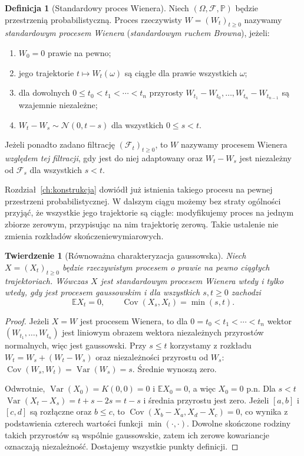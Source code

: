 \documentclass[11pt,a4paper,oneside]{report}
\numberwithin{equation}{chapter}
\theoremstyle{plain}
\newtheorem{twierdzenie}{Twierdzenie}[chapter]
\theoremstyle{definition}
\newtheorem{definicja}{Definicja}[chapter]
\theoremstyle{remark}
\newcommand{\Prob}{\mathbb{P}}
\newcommand{\E}{\mathbb{E}}
\newcommand{\Var}{\operatorname{Var}}
\newcommand{\Cov}{\operatorname{Cov}}
\newcommand{\calF}{\mathcal{F}}
\newcommand{\Normal}{\mathcal{N}}
\begin{document}
\begin{definicja}[Standardowy proces Wienera]
Niech $(\Omega,\calF,\Prob)$ będzie przestrzenią probabilistyczną.
Proces rzeczywisty $W=(W_t)_{t\ge0}$ nazywamy
\emph{standardowym procesem Wienera} (\emph{standardowym ruchem Browna}),
jeżeli:
\begin{enumerate}
\item $W_0=0$ prawie na pewno;
\item jego trajektorie $t\mapsto W_t(\omega)$ są ciągłe dla prawie
wszystkich $\omega$;
\item dla dowolnych $0\le t_0<t_1<\cdots<t_n$ przyrosty
$W_{t_1}-W_{t_0},\ldots,W_{t_n}-W_{t_{n-1}}$
są wzajemnie niezależne;
\item $W_t-W_s\sim\Normal(0,t-s)$ dla wszystkich $0\le s<t$.
\end{enumerate}
Jeżeli ponadto zadano filtrację $(\calF_t)_{t\ge0}$, to $W$
nazywamy procesem Wienera \emph{względem tej filtracji},
gdy jest do niej adaptowany oraz $W_t-W_s$ jest niezależny
od $\calF_s$ dla wszystkich $s<t$.
\end{definicja}

Rozdział~\ref{ch:konstrukcja} dowiódł już istnienia takiego
procesu na pewnej przestrzeni probabilistycznej.
W dalszym ciągu możemy bez straty ogólności przyjąć,
że wszystkie jego trajektorie są ciągłe: modyfikujemy proces
na jednym zbiorze zerowym, przypisując na nim trajektorię zerową.
Takie ustalenie nie zmienia rozkładów skończeniewymiarowych.

\begin{twierdzenie}[Równoważna charakteryzacja gaussowska]
Niech $X=(X_t)_{t\ge0}$ będzie rzeczywistym procesem
o prawie na pewno ciągłych trajektoriach. Wówczas $X$
jest standardowym procesem Wienera wtedy i tylko wtedy,
gdy jest procesem gaussowskim i dla wszystkich $s,t\ge0$
zachodzi
\[
\E X_t=0,\qquad \Cov(X_s,X_t)=\min(s,t).
\]
\end{twierdzenie}
\begin{proof}
Jeżeli $X=W$ jest procesem Wienera, to dla
$0=t_0<t_1<\cdots<t_n$ wektor $(W_{t_1},\ldots,W_{t_n})$
jest liniowym obrazem wektora niezależnych przyrostów normalnych,
więc jest gaussowski. Przy $s\le t$ korzystamy z rozkładu
$W_t=W_s+(W_t-W_s)$ oraz niezależności przyrostu od $W_s$:
$\Cov(W_s,W_t)=\Var(W_s)=s$. Średnie wynoszą zero.

Odwrotnie, $\Var(X_0)=K(0,0)=0$ i $\E X_0=0$,
a więc $X_0=0$ p.n. Dla $s<t$
$\Var(X_t-X_s)=t+s-2s=t-s$ i średnia przyrostu
jest zero. Jeżeli $[a,b]$ i $[c,d]$ są rozłączne oraz $b\le c$,
to $\Cov(X_b-X_a,X_d-X_c)=0$, co wynika z podstawienia
czterech wartości funkcji $\min(\cdot,\cdot)$.
Dowolne skończone rodziny takich przyrostów są wspólnie
gaussowskie, zatem ich zerowe kowariancje oznaczają niezależność.
Dostajemy wszystkie punkty definicji.
\end{proof}
\end{document}
